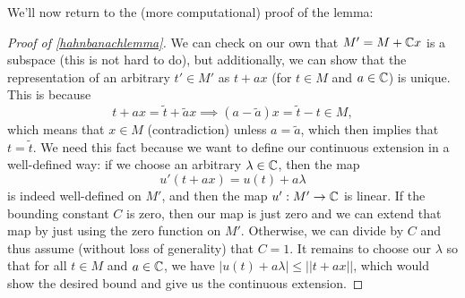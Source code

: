 We'll now return to the (more computational) proof of the lemma:

\begin{proof}[Proof of \cref{hahnbanachlemma}]
We can check on our own that $M' = M + \mathbb C x$ is a subspace (this is not hard to do), but additionally, we can show that the representation of an arbitrary $t' \in M'$ as $t + ax$ (for $t \in M$ and $a \in \mathbb C$) is unique. This is because 
\[
    t + ax = \tilde{t} + \tilde{a}x \implies (a - \tilde{a})x = \tilde{t} -t \in M,
\]
which means that $x \in M$ (contradiction) unless $a = \tilde{a}$, which then implies that $t = \tilde{t}$. We need this fact because we want to define our continuous extension in a well-defined way: if we choose an arbitrary $\lambda \in \mathbb C$, then the map 
\[
    u'(t + ax) = u(t) + a\lambda
\]
is indeed well-defined on $M'$, and then the map $u': M' \to \mathbb C$ is linear. If the bounding constant $C$ is zero, then our map is just zero and we can extend that map by just using the zero function on $M'$. Otherwise, we can divide by $C$ and thus assume (without loss of generality) that $C = 1$. It remains to choose our $\lambda$ so that for all $t \in M$ and $a \in \mathbb C$, we have $|u(t) + a\lambda| \le ||t + ax||$, which would show the desired bound and give us the continuous extension.


\end{proof}
